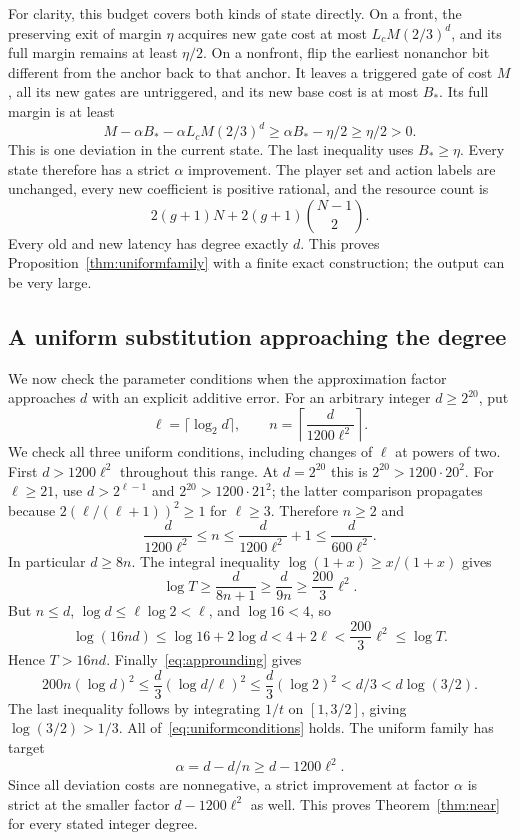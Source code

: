 \documentclass[11pt]{article}
\theoremstyle{definition}
\begin{document}
For clarity, this budget covers both kinds of state directly. On a front, the preserving exit of margin $\eta$ acquires new gate cost at most $L_cM(2/3)^d$, and its full margin remains at least $\eta/2$. On a nonfront, flip the earliest nonanchor bit different from the anchor back to that anchor. It leaves a triggered gate of cost $M$, all its new gates are untriggered, and its new base cost is at most $B_*$. Its full margin is at least
\[
 M-\alpha B_*-\alpha L_cM(2/3)^d
 \ge\alpha B_*-\eta/2\ge\eta/2>0.
\]
This is one deviation in the current state. The last inequality uses $B_*\ge\eta$. Every state therefore has a strict $\alpha$ improvement. The player set and action labels are unchanged, every new coefficient is positive rational, and the resource count is
\begin{equation}\label{eq:appresourcecount}
 2(g+1)N+2(g+1)\binom{N-1}{2}.
\end{equation}
Every old and new latency has degree exactly $d$. This proves Proposition~\ref{thm:uniformfamily} with a finite exact construction; the output can be very large.

\subsection{A uniform substitution approaching the degree}\label{app:tail}
We now check the parameter conditions when the approximation factor approaches $d$ with an explicit additive error. For an arbitrary integer $d\ge2^{20}$, put
\begin{equation}\label{eq:appnearparams}
 \ell=\lceil\log_2d\rceil,\qquad
 n=\left\lceil\frac{d}{1200\ell^2}\right\rceil.
\end{equation}
We check all three uniform conditions, including changes of $\ell$ at powers of two.
First $d>1200\ell^2$ throughout this range. At $d=2^{20}$ this is $2^{20}>1200\cdot20^2$. For $\ell\ge21$, use $d>2^{\ell-1}$ and $2^{20}>1200\cdot21^2$; the latter comparison propagates because $2(\ell/(\ell+1))^2\ge1$ for $\ell\ge3$. Therefore $n\ge2$ and
\begin{equation}\label{eq:approunding}
 \frac{d}{1200\ell^2}\le n
 \le\frac{d}{1200\ell^2}+1
 \le\frac{d}{600\ell^2}.
\end{equation}
In particular $d\ge8n$. The integral inequality $\log(1+x)\ge x/(1+x)$ gives
\[
 \log T\ge\frac{d}{8n+1}\ge\frac{d}{9n}
 \ge\frac{200}{3}\ell^2.
\]
But $n\le d$, $\log d\le\ell\log2<\ell$, and $\log16<4$, so
\[
 \log(16nd)\le\log16+2\log d<4+2\ell
 <\frac{200}{3}\ell^2\le\log T.
\]
Hence $T>16nd$. Finally~\eqref{eq:approunding} gives
\[
 200n(\log d)^2
 \le\frac d3(\log d/\ell)^2
 \le\frac d3(\log2)^2
 <d/3<d\log(3/2).
\]
The last inequality follows by integrating $1/t$ on $[1,3/2]$, giving $\log(3/2)>1/3$. All of~\eqref{eq:uniformconditions} holds. The uniform family has target
\[
 \alpha=d-d/n\ge d-1200\ell^2.
\]
Since all deviation costs are nonnegative, a strict improvement at factor $\alpha$ is strict at the smaller factor $d-1200\ell^2$ as well. This proves Theorem~\ref{thm:near} for every stated integer degree.
\end{document}
